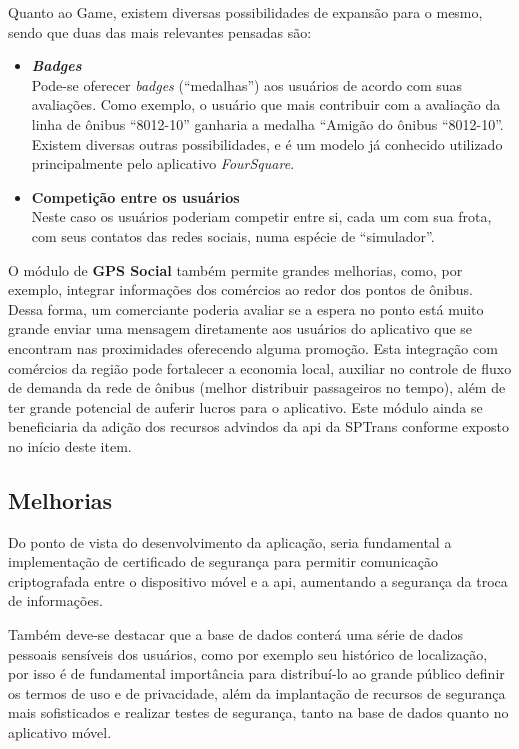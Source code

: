 Quanto ao Game, existem diversas possibilidades de expansão para o mesmo, sendo que duas das mais relevantes pensadas são:
\begin{itemize}
    \item \textbf{\textit{Badges}} \hfill \\
    Pode-se oferecer \textit{badges} (``medalhas'') aos usuários de acordo com suas avaliações. Como exemplo, o usuário que mais contribuir com a avaliação da linha de ônibus ``8012-10'' ganharia a medalha ``Amigão do ônibus ``8012-10''. Existem diversas outras possibilidades, e é um modelo já conhecido utilizado principalmente pelo aplicativo \textit{FourSquare}.
    \item \textbf{Competição entre os usuários} \hfill \\
    Neste caso os usuários poderiam competir entre si, cada um com sua frota, com seus contatos das redes sociais, numa espécie de ``simulador''.
\end{itemize}

O módulo de \textbf{GPS Social} também permite grandes melhorias, como, por exemplo, integrar informações dos comércios ao redor dos pontos de ônibus. Dessa forma, um comerciante poderia avaliar se a espera no ponto está muito grande enviar uma mensagem diretamente aos usuários do aplicativo que se encontram nas proximidades oferecendo alguma promoção. Esta integração com comércios da região pode fortalecer a economia local, auxiliar no controle de fluxo de demanda da rede de ônibus (melhor distribuir passageiros no tempo), além de ter grande potencial de auferir lucros para o aplicativo.
Este módulo ainda se beneficiaria da adição dos recursos advindos da \gls{api} da SPTrans conforme exposto no início deste item.

\subsection{Melhorias}
Do ponto de vista do desenvolvimento da aplicação, seria fundamental a implementação de certificado de segurança para permitir comunicação criptografada entre o dispositivo móvel e a \gls{api}, aumentando a segurança da troca de informações.

Também deve-se destacar que a base de dados conterá uma série de dados pessoais sensíveis dos usuários, como por exemplo seu histórico de localização, por isso é de fundamental importância para distribuí-lo ao grande público definir os termos de uso e de privacidade, além da implantação de recursos de segurança mais sofisticados e realizar testes de segurança, tanto na base de dados quanto no aplicativo móvel.

